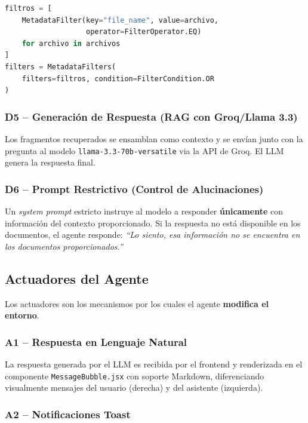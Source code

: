\documentclass[12pt,a4paper]{article}
\begin{document}
\begin{lstlisting}[language=Python, caption={Aplicación de filtros por archivo en la consulta.}]
filtros = [
    MetadataFilter(key="file_name", value=archivo,
                   operator=FilterOperator.EQ)
    for archivo in archivos
]
filters = MetadataFilters(
    filters=filtros, condition=FilterCondition.OR
)
\end{lstlisting}

\subsubsection{D5 -- Generación de Respuesta (RAG con Groq/Llama 3.3)}

Los fragmentos recuperados se ensamblan como contexto y se envían junto con la pregunta al modelo \texttt{llama-3.3-70b-versatile} via la API de Groq. El LLM genera la respuesta final.

\subsubsection{D6 -- Prompt Restrictivo (Control de Alucinaciones)}

Un \textit{system prompt} estricto instruye al modelo a responder \textbf{únicamente} con información del contexto proporcionado. Si la respuesta no está disponible en los documentos, el agente responde: \textit{``Lo siento, esa información no se encuentra en los documentos proporcionados.''}

\subsection{Actuadores del Agente}

Los actuadores son los mecanismos por los cuales el agente \textbf{modifica el entorno}.

\subsubsection{A1 -- Respuesta en Lenguaje Natural}

La respuesta generada por el LLM es recibida por el frontend y renderizada en el componente \texttt{MessageBubble.jsx} con soporte Markdown, diferenciando visualmente mensajes del usuario (derecha) y del asistente (izquierda).

\subsubsection{A2 -- Notificaciones Toast}
\end{document}
